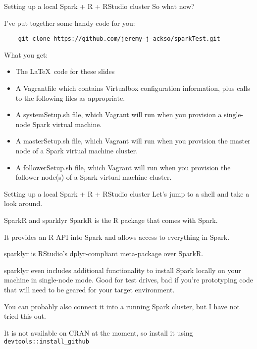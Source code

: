 \documentclass[pdf]{beamer}
\begin{document}
\begin{frame}[fragile]{Setting up a local Spark + R + RStudio cluster}
    So what now?

    I've put together some handy code for you:
    \begin{verbatim}
	git clone https://github.com/jeremy-j-ackso/sparkTest.git
    \end{verbatim}

    What you get:
    \begin{itemize}
	\item The \LaTeX\ code for these slides
	\item A Vagrantfile which contains Virtualbox configuration information, plus calls to the following files as appropriate.
	\item A systemSetup.sh file, which Vagrant will run when you provision a single-node Spark virtual machine.
	\item A masterSetup.sh file, which Vagrant will run when you provision the master node of a Spark virtual machine cluster.
	\item A followerSetup.sh file, which Vagrant will run when you provision the follower node(s) of a Spark virtual machine cluster.
    \end{itemize}
\end{frame}

\begin{frame}{Setting up a local Spark + R + RStudio cluster}
    Let's jump to a shell and take a look around.
\end{frame}

\begin{frame}{SparkR and sparklyr}
    SparkR is the R package that comes with Spark.

    It provides an R API into Spark and allows access to everything in Spark.

\vspace{20pt}

    sparklyr is RStudio's dplyr-compliant meta-package over SparkR.

    sparklyr even includes additional functionality to install Spark locally on your machine in single-node mode. Good for test drives, bad if you're prototyping code that will need to be geared for your target environment.

    You can probably also connect it into a running Spark cluster, but I have not tried this out.

    It is not available on CRAN at the moment, so install it using \texttt{devtools::install\_github}
\end{frame}
\end{document}
